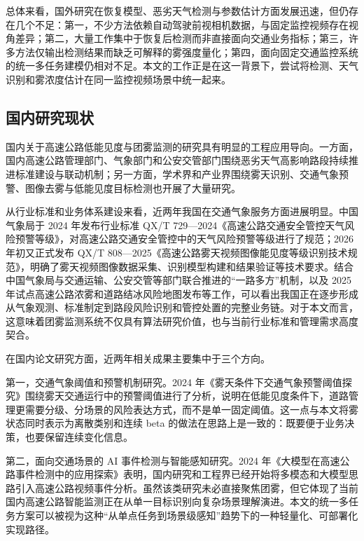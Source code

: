 总体来看，国外研究在恢复模型、恶劣天气检测与参数估计方面发展迅速，但仍存在几个不足：第一，不少方法依赖自动驾驶前视相机数据，与固定监控视频存在视角差异；第二，大量工作集中于恢复后检测而非直接面向交通业务指标；第三，许多方法仅输出检测结果而缺乏可解释的雾强度量化；第四，面向固定交通监控系统的统一多任务建模仍相对不足。本文的工作正是在这一背景下，尝试将检测、天气识别和雾浓度估计在同一监控视频场景中统一起来。

\subsection{国内研究现状}

国内关于高速公路低能见度与团雾监测的研究具有明显的工程应用导向。一方面，国内高速公路管理部门、气象部门和公安交管部门围绕恶劣天气高影响路段持续推进标准建设与联动机制；另一方面，学术界和产业界围绕雾天识别、交通气象预警、图像去雾与低能见度目标检测也开展了大量研究\cite{chinaRoadWeatherReview,qx7292024,qx8082025}。

从行业标准和业务体系建设来看，近两年我国在交通气象服务方面进展明显。中国气象局于 2024 年发布行业标准 QX/T 729—2024《高速公路交通安全管控天气风险预警等级》，对高速公路交通安全管控中的天气风险预警等级进行了规范；2026 年初又正式发布 QX/T 808—2025《高速公路雾天视频图像能见度等级识别技术规范》，明确了雾天视频图像数据采集、识别模型构建和结果验证等技术要求\cite{qx7292024,qx8082025}。结合中国气象局与交通运输、公安交管等部门联合推进的“一路多方”机制，以及 2025 年试点高速公路浓雾和道路结冰风险地图发布等工作，可以看出我国正在逐步形成从气象观测、标准制定到路段风险识别和管控处置的完整业务链\cite{cmaRiskMap2025,cmaThreshold2025,chinaRoadWeatherReview}。对于本文而言，这意味着团雾监测系统不仅具有算法研究价值，也与当前行业标准和管理需求高度契合。

在国内论文研究方面，近两年相关成果主要集中于三个方向\cite{sunxiao2024,xingwanyong2024,cycleganDehaze2025,hybridConvDehaze2025,umtHpla2025}。

第一，交通气象阈值和预警机制研究。2024 年《雾天条件下交通气象预警阈值探究》围绕雾天交通运行中的预警阈值进行了分析，说明在低能见度条件下，道路管理更需要分级、分场景的风险表达方式，而不是单一固定阈值\cite{sunxiao2024}。这一点与本文将雾状态同时表示为离散类别和连续 beta 的做法在思路上是一致的：既要便于业务决策，也要保留连续变化信息。

第二，面向交通场景的 AI 事件检测与智能感知研究。2024 年《大模型在高速公路事件检测中的应用探索》表明，国内研究和工程界已经开始将多模态和大模型思路引入高速公路视频事件分析\cite{xingwanyong2024}。虽然该类研究未必直接聚焦团雾，但它体现了当前国内高速公路智能监测正在从单一目标识别向复杂场景理解演进。本文的统一多任务方案可以被视为这种“从单点任务到场景级感知”趋势下的一种轻量化、可部署化实现路径。

